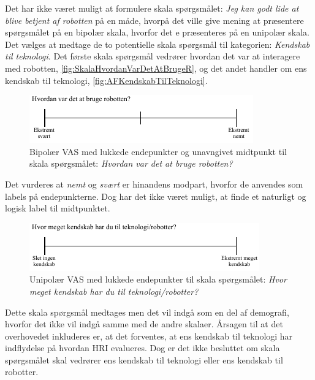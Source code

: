 \noindent
%
Det har ikke været muligt at formulere skala spørgsmålet: \textit{Jeg kan godt lide at blive betjent af robotten} på en måde, hvorpå det ville give mening at præsentere spørgsmålet på en bipolær skala, hvorfor det e præsenteres på en unipolær skala.\blankline
%
Det vælges at medtage de to potentielle skala spørgsmål til kategorien: \textit{Kendskab til teknologi}. Det første skala spørgsmål vedrører hvordan det var at interagere med robotten, \autoref{fig:SkalaHvordanVarDetAtBrugeR}, og det andet handler om ens kendskab til teknologi, \autoref{fig:AFKendskabTilTeknologi}.
%
\begin{figure}[H]
\centering
\includegraphics[width =\textwidth]{Figure/UdvalgteSkalaer/HvordanVarDetAtBrugeR} 
\caption{Bipolær VAS med lukkede endepunkter og unavngivet midtpunkt til skala spørgsmålet: \textit{Hvordan var det at bruge robotten?}}
\label{fig:SkalaHvordanVarDetAtBrugeR}
\end{figure}
\noindent
%
Det vurderes at \textit{nemt} og \textit{svært} er hinandens modpart, hvorfor de anvendes som labels på endepunkterne. Dog har det ikke været muligt, at finde et naturligt og logisk label til midtpunktet.
\newpage 
%
\begin{figure}[H]
\centering
\includegraphics[width =\textwidth]{Figure/UdvalgteSkalaer/KendskabTilTeknologi} 
\caption{Unipolær VAS med lukkede endepunkter til skala spørgsmålet: \textit{Hvor meget kendskab har du til teknologi/robotter?}}
\label{fig:SkalaKendskabTilTeknologi}
\end{figure}
\noindent
%
Dette skala spørgsmål medtages men det vil indgå som en del af demografi, hvorfor det ikke vil indgå samme med de andre skalaer. Årsagen til at det overhovedet inkluderes er, at det forventes, at ens kendskab til teknologi har indflydelse på hvordan HRI evalueres. Dog er det ikke besluttet om skala spørgsmålet skal vedrører ens kendskab til teknologi eller ens kendskab til robotter. \blankline 
